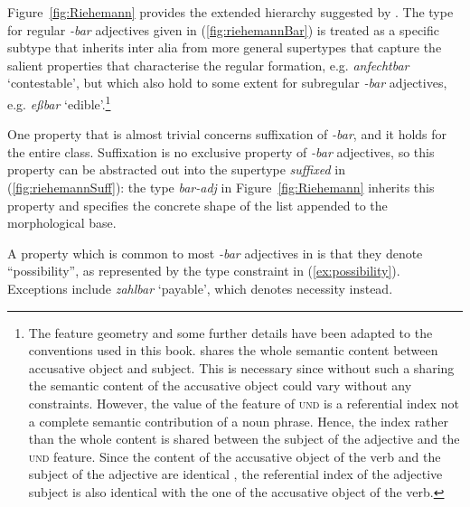 \documentclass[output=paper
	        ,collection
	        ,collectionchapter
 	        ,biblatex
                ,babelshorthands
                ,newtxmath
                ,draftmode
                ,colorlinks, citecolor=brown
]{langscibook}
\begin{document}
Figure~\ref{fig:Riehemann} provides the extended hierarchy suggested
by \citet{Riehemann98}. The type for regular \textit{-bar} adjectives
given in (\ref{fig:riehemannBar}) is treated as a specific subtype
that inherits inter alia from more general supertypes that capture the
salient properties that characterise the regular formation,
e.g. \textit{anfechtbar} `contestable', but which
also hold to some extent for subregular \textit{-bar} adjectives,
e.g. \textit{eßbar} `edible'.\footnote{%
The feature geometry and some further details have been adapted to the conventions used in this
book. \citet[]{Riehemann98} shares the whole semantic content between accusative object and
subject. This is necessary since without such a sharing the semantic content of the accusative
object could vary without any constraints. However, the value of the feature of \textsc{und} is a
referential index not a complete semantic contribution of a noun phrase. Hence, the index 
rather than the whole content is shared between the subject of the adjective and the \textsc{und}
feature. Since the content of the accusative object of the verb and the subject of the adjective are
identical , the referential index of the adjective subject is also identical with the one of the
accusative object of the verb.
}

  
One property that is almost trivial concerns suffixation of
\textit{-bar}, and it holds for the entire class. Suffixation is no
exclusive property of \textit{-bar} adjectives, so this property can
be abstracted out into the supertype \textit{suffixed} in
(\ref{fig:riehemannSuff}): the type \textit{bar-adj} in
Figure~\ref{fig:Riehemann} inherits this property and specifies the
concrete shape of the list appended to the morphological base.

\ea
	\label{fig:riehemannSuff}
\z


\begin{sloppypar}
  A property which is common to most \textit{-bar} adjectives in
   is that they denote ``possibility'', as represented by the
  type constraint in (\ref{ex:possibility}). Exceptions include
  \textit{zahlbar} `payable', which denotes necessity instead. 
\end{sloppypar}

\begin{exe}

  \ex \label{ex:possibility}
\end{exe}
\end{document}
